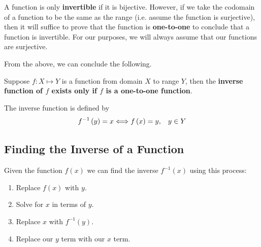 \documentclass[11pt,a4paper]{book}
\begin{document}
\bigskip{}

A function is only \textbf{invertible }if it is bijective. However,
if we take the codomain of a function to be the same as the range (i.e. assume the function is surjective), then it will suffice to prove that the function is \textbf{one-to-one} to conclude that a function is invertible. For our purposes, we will always assume that our functions are surjective.

From the above, we can conclude the following.

\begin{tcolorbox}[colback=blue!5, colframe=black,boxrule=.4pt, sharpish corners]

Suppose $f:X\mapsto Y$ is a function from domain $X$ to range $Y$,
then the \textbf{inverse function of $f$ exists only if $f$ is a one-to-one function}.

The inverse function is defined by
\[
f^{-1}\left(y\right)=x\Longleftrightarrow f\left(x\right)=y,\hspace{0.3cm}y\in Y
\]
\end{tcolorbox}


\subsection{Finding the Inverse of a Function}

\begin{tcolorbox}[colback=blue!5, colframe=black,boxrule=.4pt, sharpish corners]

Given the function $f\left(x\right)$ we can find the inverse $f^{-1}\left(x\right)$
using this process:
\begin{enumerate}
\item Replace $f\left(x\right)$ with $y$.
\item Solve for $x$ in terms of $y$.
\item Replace $x$ with $f^{-1}\left(y\right)$.
\item Replace our $y$ term with our $x$ term.
\end{enumerate}
\end{tcolorbox}

\newpage
\end{document}
